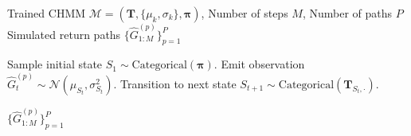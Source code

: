 \begin{algorithm}[tp]
\caption{CHMM simulation of synthetic excess growth rate paths}
\label{alg:chmm_simulate}
\small
\begin{algorithmic}[1]
\REQUIRE Trained CHMM $\mathcal{M} = (\mathbf{T}, \{\mu_k, \sigma_k\}, \boldsymbol{\pi})$, Number of steps $M$, Number of paths $P$
\ENSURE Simulated return paths $\{\hat{G}^{(p)}_{1:M}\}_{p=1}^{P}$

    \STATE Sample initial state $S_1 \sim \text{Categorical}(\boldsymbol{\pi})$.
        \STATE Emit observation $\hat{G}_t^{(p)} \sim \mathcal{N}(\mu_{S_t}, \sigma_{S_t}^2)$.
            \STATE Transition to next state $S_{t+1} \sim \text{Categorical}(\mathbf{T}_{S_t, \cdot})$.
        \ENDIF
    \ENDFOR
\ENDFOR

\RETURN $\{\hat{G}^{(p)}_{1:M}\}_{p=1}^{P}$
\end{algorithmic}
\end{algorithm}

